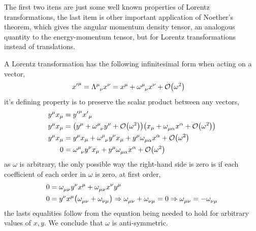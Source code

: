 \problem{}

The first two itens are just some well known properties of Lorentz transformations, the last item is other 
important application of Noether's theorem, which gives the angular momentum density tensor, an analogous 
quantity to the energy-momentum tensor, but for Lorentz transformations instead of translations.

\probitem{}

A Lorentz transformation has the following infinitesimal form when acting on a vector,
\begin{align}
    {x'}^\mu &= \tensor{\Lambda}{^\mu_\nu}x^\nu=x^\mu+\tensor{\omega}{^\mu_\nu}x^\nu+\mathcal O\qty(\omega^2)
\end{align}
it's defining property is to preserve the scalar product between any vectors,
\begin{align}
    y^\mu x_\mu &= {y'}^\mu{x'}_\mu\\
    y^\mu x_\mu &= \qty(y^\mu+\tensor{\omega}{^\mu_\nu}y^\nu+\mathcal O\qty(\omega^2))\qty(x_\mu+\tensor{\omega}{_\mu_\alpha}x^\alpha+\mathcal O\qty(\omega^2))\\
    y^\mu x_\mu &=  y^\mu x_\mu +\tensor{\omega}{^\mu_\nu}y^\nu x_\mu + y^\mu\tensor{\omega}{_\mu_\alpha}x^\alpha+\mathcal O\qty(\omega^2)\\
    0 &=  \tensor{\omega}{^\mu_\nu}y^\nu x_\mu + y^\mu\tensor{\omega}{_\mu_\alpha}x^\alpha+\mathcal O\qty(\omega^2)
\end{align}
as $\omega$ is arbitrary, the only possible way the right-hand side is zero is if each coefficient of each order in $\omega$ is zero,
at first order,
\begin{align}
    0&=\tensor{\omega}{_\mu_\nu}y^\nu x^\mu + \tensor{\omega}{_\mu_\nu}x^\nu y^\mu\\
    0&=y^\nu x^\mu\qty(\tensor{\omega}{_\mu_\nu} + \tensor{\omega}{_\nu_\mu})\Rightarrow \tensor{\omega}{_\mu_\nu} + \tensor{\omega}{_\nu_\mu}=0\Rightarrow \tensor{\omega}{_\mu_\nu} =- \tensor{\omega}{_\nu_\mu}
\end{align}
the lasts equalities follow from the equation being needed to hold for arbitrary values of $x,y$. We conclude that $\omega$ is anti-symmetric.

\probitem{}

